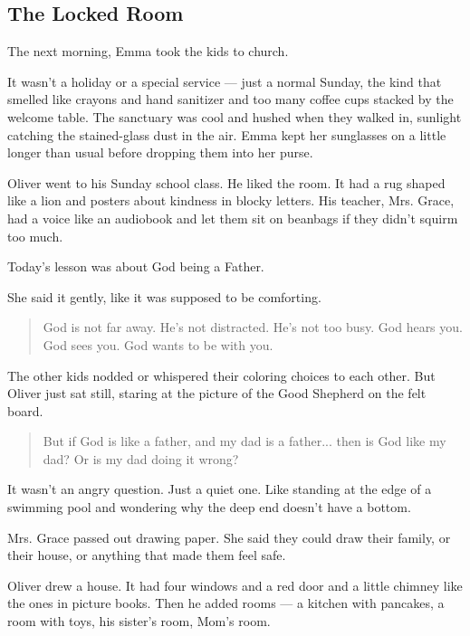 
\subsection{The Locked Room}

The next morning, Emma took the kids to church.

It wasn’t a holiday or a special service — just a normal Sunday, the kind that smelled like crayons and 
hand sanitizer and too many coffee cups stacked by the welcome table. The sanctuary was cool and hushed 
when they walked in, sunlight catching the stained-glass dust in the air. Emma kept her sunglasses on 
a little longer than usual before dropping them into her purse.

Oliver went to his Sunday school class. He liked the room. It had a rug shaped like a lion and posters 
about kindness in blocky letters. His teacher, Mrs. Grace, had a voice like an audiobook and let them 
sit on beanbags if they didn’t squirm too much.

Today’s lesson was about God being a Father.

She said it gently, like it was supposed to be comforting.

\begin{quote}
God is not far away. He’s not distracted. He’s not too busy. God hears you. God sees you. God wants to 
be with you.
\end{quote}

The other kids nodded or whispered their coloring choices to each other. But Oliver just sat still, 
staring at the picture of the Good Shepherd on the felt board.

\medskip

\begin{quote}
But if God is like a father, and my dad is a father...
then is God like my dad?
Or is my dad doing it wrong?
\end{quote}

\medskip

It wasn’t an angry question. Just a quiet one. Like standing at the edge of a swimming pool and 
wondering why the deep end doesn’t have a bottom.

Mrs. Grace passed out drawing paper. She said they could draw their family, or their house, or anything 
that made them feel safe.

Oliver drew a house. It had four windows and a red door and a little chimney like the ones in picture 
books. Then he added rooms — a kitchen with pancakes, a room with toys, his sister’s room, Mom’s room.


